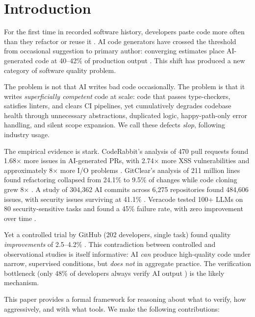 \documentclass[11pt, a4paper]{article}
\theoremstyle{definition}
\theoremstyle{remark}
\begin{document}
\section{Introduction}
\label{sec:intro}

For the first time in recorded software history, developers paste code more often than they refactor or reuse it \citep{gitclear2025}. AI code generators have crossed the threshold from occasional suggestion to primary author: converging estimates place AI-generated code at 40--42\% of production output \citep{gitclear2025, sonar2026}. This shift has produced a new category of software quality problem.

The problem is not that AI writes bad code occasionally. The problem is that it writes \emph{superficially competent} code at scale: code that passes type-checkers, satisfies linters, and clears CI pipelines, yet cumulatively degrades codebase health through unnecessary abstractions, duplicated logic, happy-path-only error handling, and silent scope expansion. We call these defects \emph{slop}, following industry usage.

The empirical evidence is stark. CodeRabbit's analysis of 470 pull requests found 1.68$\times$ more issues in AI-generated PRs, with 2.74$\times$ more XSS vulnerabilities and approximately 8$\times$ more I/O problems \citep{coderabbit2025}. GitClear's analysis of 211 million lines found refactoring collapsed from 24.1\% to 9.5\% of changes while code cloning grew 8$\times$ \citep{gitclear2025}. A study of 304,362 AI commits across 6,275 repositories found 484,606 issues, with security issues surviving at 41.1\% \citep{debtboom2026}. Veracode tested 100+ LLMs on 80 security-sensitive tasks and found a 45\% failure rate, with zero improvement over time \citep{veracode2025}.

Yet a controlled trial by GitHub (202 developers, single task) found quality \emph{improvements} of 2.5--4.2\% \citep{github2024rct}. This contradiction between controlled and observational studies is itself informative: AI \emph{can} produce high-quality code under narrow, supervised conditions, but \emph{does not} in aggregate practice. The verification bottleneck (only 48\% of developers always verify AI output \citep{sonar2026}) is the likely mechanism.

This paper provides a formal framework for reasoning about what to verify, how aggressively, and with what tools. We make the following contributions:
\end{document}
